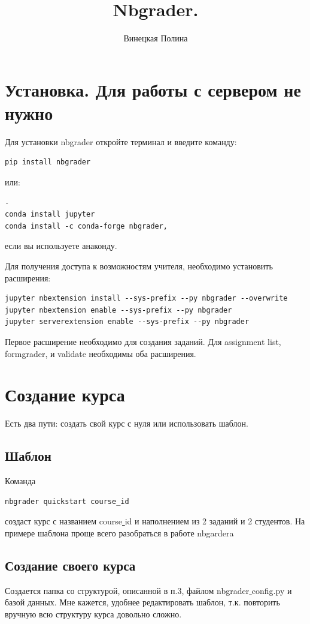 \documentclass[a4paper,12pt]{article}
\title{Nbgrader.}
\author{Винецкая Полина}
\begin{document}
\maketitle
\tableofcontents
\section{Установка. Для работы с сервером не нужно} 

Для установки nbgrader откройте терминал и введите команду:
\begin{verbatim}
pip install nbgrader
\end{verbatim}
или:
\begin{verbatim}-
conda install jupyter
conda install -c conda-forge nbgrader,
\end{verbatim}
если вы используете анаконду.

Для получения доступа к возможностям учителя, 
необходимо установить расширения:
\begin{verbatim}
jupyter nbextension install --sys-prefix --py nbgrader --overwrite
jupyter nbextension enable --sys-prefix --py nbgrader
jupyter serverextension enable --sys-prefix --py nbgrader
\end{verbatim}
Первое расширение необходимо для создания заданий.
Для assignment list, formgrader, и validate необходимы оба расширения.
\section{Создание курса} Есть два пути: создать свой курс с нуля или использовать шаблон.
\subsection{Шаблон}

Команда
\begin{verbatim}
nbgrader quickstart course_id 
\end{verbatim}
создаст курс с названием course\underline{ }id и наполнением из 2 заданий и 2 студентов. На примере шаблона проще всего разобраться в работе nbgarder\textquotesingle a
\subsection{Создание своего курса}

Создается папка со структурой, описанной в п.3, файлом nbgrader\underline{ }config.py и базой данных. Мне кажется, удобнее  редактировать шаблон, т.к. повторить вручную всю структуру курса довольно сложно.
\end{document}
